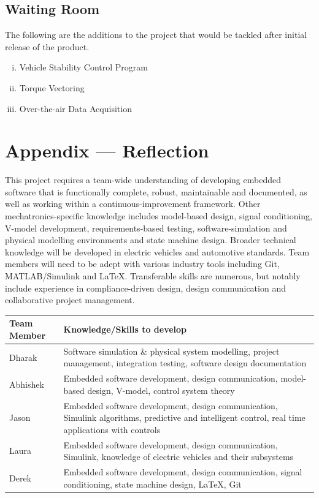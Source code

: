 \documentclass[12pt]{article}
\begin{document}
\subsection{Waiting Room}

The following are the additions to the project that would be tackled after initial release of the product.

\begin{enumerate}[(i)]
    \item Vehicle Stability Control Program
    \item Torque Vectoring
    \item Over-the-air Data Acquisition
\end{enumerate}


\section*{Appendix --- Reflection}

This project requires a team-wide understanding of developing embedded software that is functionally complete, robust, maintainable and documented, as well as working within a continuous-improvement framework. Other mechatronics-specific knowledge 
includes model-based design, signal conditioning, V-model development, requirements-based testing, software-simulation and physical modelling environments and state machine design. Broader technical knowledge will be developed in electric vehicles 
and automotive standards. Team members will need to be adept with various industry tools including Git, MATLAB/Simulink and LaTeX. Transferable skills are numerous, but notably include experience in compliance-driven design, design communication and 
collaborative project management.\\
\vspace{3mm}\noindent
\begin{tabular}{| p{} | p{}|}
    \hline
    \rowcolor[gray]{0.9}
    Team Member & Knowledge/Skills to develop  \\
    \hline
    Dharak & Software simulation \& physical system modelling, project management, integration testing, software design documentation \\
    \hline
    Abhishek & Embedded software development, design communication, model-based design, V-model, control system theory \\
    \hline
    Jason & Embedded software development, design communication, Simulink algorithms, predictive and intelligent control, real time applications with controls\\
    \hline
    Laura & Embedded software development, design communication, Simulink, knowledge of electric vehicles and their subsystems \\
    \hline
    Derek & Embedded software development, design communication, signal conditioning, state machine design, LaTeX, Git \\
    \hline
\end{tabular}
\end{document}
